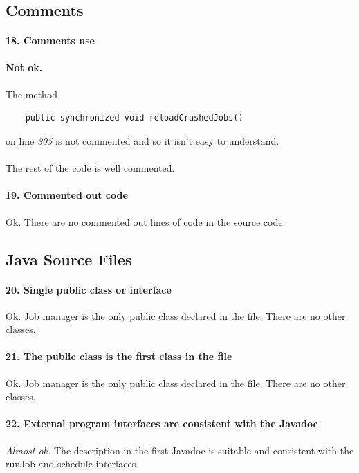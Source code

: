 \documentclass[english]{article}
\begin{document}
\subsection{Comments}

\paragraph{18. Comments use}
\textcolor{cornellred}{\textbf{Not ok.}}
\paragraph{}
The method 
\begin{lstlisting} 
	public synchronized void reloadCrashedJobs() 
\end{lstlisting}

 on line \textit{305} is not commented and so it isn't easy to understand. 
\paragraph{}
The rest of the code is well commented.

\paragraph{19. Commented out code}
Ok. There are no commented out lines of code in the source code.

\subsection{Java Source Files}
\paragraph{20. Single public class or interface}
Ok.
Job manager is the only public class declared in the file.
There are no other classes.

\paragraph{21. The public class is the first class in the file}
Ok.
Job manager is the only public class declared in the file.
There are no other classes.

\paragraph{22. External program interfaces are consistent with the Javadoc}
\textit{Almost ok.}
The description in the first Javadoc is suitable and consistent with the runJob and schedule interfaces.
\end{document}
